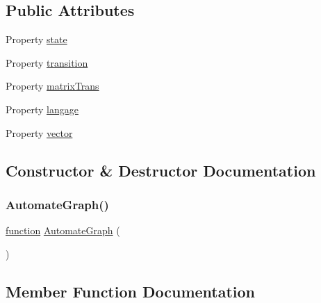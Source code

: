 \subsection*{Public Attributes}
\begin{DoxyCompactItemize}
\item 
Property \hyperlink{class_automate_graph_a63137664c417e5ecda498b5d40db172d}{state}
\item 
Property \hyperlink{class_automate_graph_ac363c0c5cc9c182bd3b2c7560425f93e}{transition}
\item 
Property \hyperlink{class_automate_graph_a483504249e375605c2256a008cf85cae}{matrix\+Trans}
\item 
Property \hyperlink{class_automate_graph_a36bfd89ca8de9ccda18653d619af459c}{langage}
\item 
Property \hyperlink{class_automate_graph_a5072c909ca262b35ea71867b7b52a01b}{vector}
\end{DoxyCompactItemize}


\subsection{Constructor \& Destructor Documentation}
\mbox{\label{class_automate_graph_aff151c681b4561197919d5820d1e1053}} 
\subsubsection{\texorpdfstring{Automate\+Graph()}{AutomateGraph()}}
{\footnotesize\ttfamily \hyperlink{_plan__desuma_functions_8m_ac2ffb26d6f42d3bbcd7847b0873403f4}{function} \hyperlink{class_automate_graph}{Automate\+Graph} (\begin{DoxyParamCaption}{ }\end{DoxyParamCaption})}



\subsection{Member Function Documentation}
\mbox{\label{class_automate_graph_af2c974a8c1188f055e5661fd6a849f7a}} 
